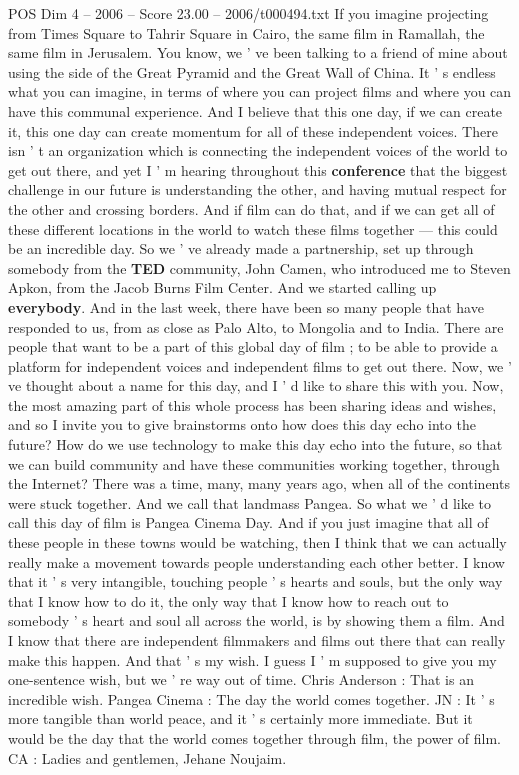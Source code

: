 \begin{textsample}{POS Dim 4 – 2006 – Score 23.00 – 2006/t000494.txt}
If you imagine projecting from Times Square to Tahrir Square in Cairo, the same film in Ramallah, the same film in Jerusalem.
You know, we ' ve been talking to a friend of mine about using the side of the Great Pyramid and the Great Wall of China.
It ' s endless what you can imagine, in terms of where you can project films and where you can have this communal experience.
And I believe that this one day, if we can create it, this one day can create momentum for all of these independent voices.
There isn ' t an organization which is connecting the independent voices of the world to get out there, and yet I ' m hearing throughout this \textbf{conference} that the biggest challenge in our future is understanding the other, and having mutual respect for the other and crossing borders.
And if film can do that, and if we can get all of these different locations in the world to watch these films together — this could be an incredible day.
So we ' ve already made a partnership, set up through somebody from the \textbf{TED} community, John Camen, who introduced me to Steven Apkon, from the Jacob Burns Film Center.
And we started calling up \textbf{everybody}.
And in the last week, there have been so many people that have responded to us, from as close as Palo Alto, to Mongolia and to India.
There are people that want to be a part of this global day of film ; to be able to provide a platform for independent voices and independent films to get out there.
Now, we ' ve thought about a name for this day, and I ' d like to share this with you.
Now, the most amazing part of this whole process has been sharing ideas and wishes, and so I invite you to give brainstorms onto how does this day echo into the future?
How do we use technology to make this day echo into the future, so that we can build community and have these communities working together, through the Internet?
There was a time, many, many years ago, when all of the continents were stuck together.
And we call that landmass Pangea.
So what we ' d like to call this day of film is Pangea Cinema Day.
And if you just imagine that all of these people in these towns would be watching, then I think that we can actually really make a movement towards people understanding each other better.
I know that it ' s very intangible, touching people ' s hearts and souls, but the only way that I know how to do it, the only way that I know how to reach out to somebody ' s heart and soul all across the world, is by showing them a film.
And I know that there are independent filmmakers and films out there that can really make this happen.
And that ' s my wish.
I guess I ' m supposed to give you my one-sentence wish, but we ' re way out of time.
Chris Anderson : That is an incredible wish.
Pangea Cinema : The day the world comes together.
JN : It ' s more tangible than world peace, and it ' s certainly more immediate.
But it would be the day that the world comes together through film, the power of film.
CA : Ladies and gentlemen, Jehane Noujaim.

\end{textsample}
